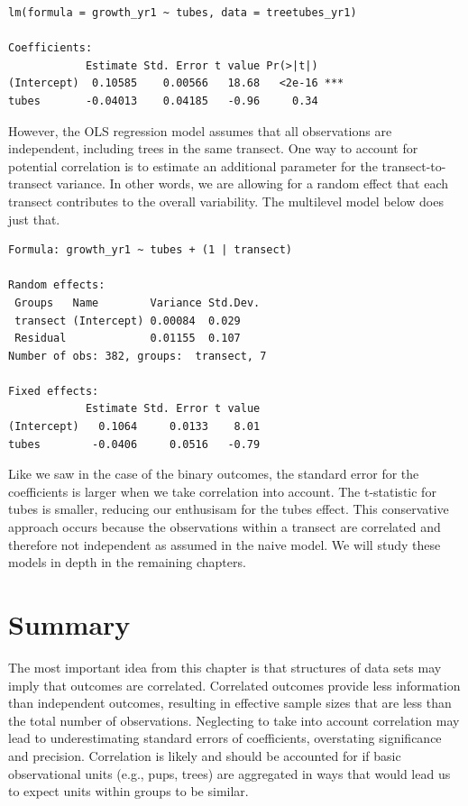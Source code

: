 \documentclass[
]{krantz}
\begin{document}
\begin{verbatim}
lm(formula = growth_yr1 ~ tubes, data = treetubes_yr1)

Coefficients:
            Estimate Std. Error t value Pr(>|t|)    
(Intercept)  0.10585    0.00566   18.68   <2e-16 ***
tubes       -0.04013    0.04185   -0.96     0.34    
\end{verbatim}

However, the OLS regression model assumes that all observations are independent, including trees in the same transect. One way to account for potential correlation is to estimate an additional parameter for the transect-to-transect variance. In other words, we are allowing for a random effect that each transect contributes to the overall variability. The multilevel model below does just that.

\begin{verbatim}
Formula: growth_yr1 ~ tubes + (1 | transect)

Random effects:
 Groups   Name        Variance Std.Dev.
 transect (Intercept) 0.00084  0.029   
 Residual             0.01155  0.107   
Number of obs: 382, groups:  transect, 7

Fixed effects:
            Estimate Std. Error t value
(Intercept)   0.1064     0.0133    8.01
tubes        -0.0406     0.0516   -0.79
\end{verbatim}

Like we saw in the case of the binary outcomes, the standard error for the coefficients is larger when we take correlation into account. The t-statistic for tubes is smaller, reducing our enthusisam for the tubes effect. This conservative approach occurs because the observations within a transect are correlated and therefore not independent as assumed in the naive model. We will study these models in depth in the remaining chapters.

\hypertarget{summary-2}{%
\section{Summary}\label{summary-2}}

The most important idea from this chapter is that structures of data sets may imply that outcomes are correlated. Correlated outcomes provide less information than independent outcomes, resulting in effective sample sizes that are less than the total number of observations. Neglecting to take into account correlation may lead to underestimating standard errors of coefficients, overstating significance and precision. Correlation is likely and should be accounted for if basic observational units (e.g., pups, trees) are aggregated in ways that would lead us to expect units within groups to be similar.
\end{document}
